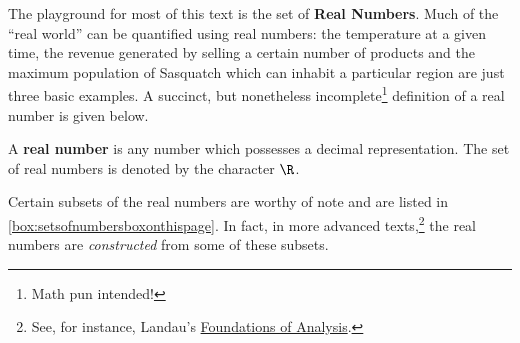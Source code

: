 The playground for most of this text is the set of \textbf{Real Numbers}.  Much of the ``real world'' can be quantified using real numbers: the temperature at a given time, the revenue generated by selling a certain number of products and the maximum population of Sasquatch which can inhabit a particular region are just three basic examples.   A succinct, but nonetheless incomplete\footnote{Math pun intended!} definition of a real number is given below.

\begin{tcolorbox}
\begin{defn} \label{realnumberdefn}

A \textbf{real number} is any number which possesses a decimal representation.  The set of real numbers is denoted by the character $\R$.  

\end{defn}
\end{tcolorbox}

Certain subsets of the real numbers are worthy of note and are listed in \autoref{box:setsofnumbersboxonthispage}.  In fact, in more advanced texts,\footnote{See, for instance, Landau's \underline{Foundations of Analysis}.}   the real numbers are \textit{constructed} from some of these subsets.  

